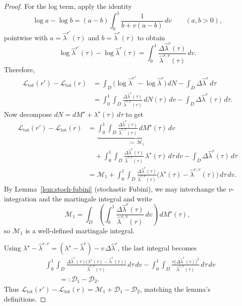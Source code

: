 \documentclass{statsoc}
\newcommand{\1}{\mathbbm{1}}
\begin{document}
\begin{proof}
For the log term, apply the identity
\[
\log a-\log b
=
(a-b)\int_0^1\frac{1}{b+v(a-b)}\,dv
\qquad(a,b>0),
\]
pointwise with $a=\widehat\lambda^{r'}(\tau)$ and $b=\widehat\lambda^{r}(\tau)$ to obtain
\[
\log\widehat\lambda^{r'}(\tau)-\log\widehat\lambda^{r}(\tau)
=
\int_0^1 \frac{\Delta\widehat\lambda^{r}(\tau)}{\widehat\lambda^{r,v}(\tau)}\,dv.
\]
Therefore,
\begin{align*}
\mathcal L_{\mathrm{tot}}(r')-\mathcal L_{\mathrm{tot}}(r)
&=
\int_D\big(\log\widehat\lambda^{r'}-\log\widehat\lambda^{r}\big)\,dN
-
\int_D \Delta\widehat\lambda^{r}\,d\tau\\
&=
\int_0^1\int_D \frac{\Delta\widehat\lambda^{r}(\tau)}{\widehat\lambda^{r,v}(\tau)}\,dN(\tau)\,dv
-
\int_D \Delta\widehat\lambda^{r}(\tau)\,d\tau.
\end{align*}
Now decompose $dN=dM^\star+\lambda^\star(\tau)\,d\tau$ to get
\begin{align*}
\mathcal L_{\mathrm{tot}}(r')-\mathcal L_{\mathrm{tot}}(r)
&=
\underbrace{\int_0^1\int_D \frac{\Delta\widehat\lambda^{r}(\tau)}{\widehat\lambda^{r,v}(\tau)}\,dM^\star(\tau)\,dv}_{:=\,\mathcal M_1}
\\&\quad+
\int_0^1\int_D \frac{\Delta\widehat\lambda^{r}(\tau)}{\widehat\lambda^{r,v}(\tau)}\,\lambda^\star(\tau)\,d\tau\,dv
-
\int_D \Delta\widehat\lambda^{r}(\tau)\,d\tau\\
&=
\mathcal M_1
+
\int_0^1\int_D \frac{\Delta\widehat\lambda^{r}(\tau)}{\widehat\lambda^{r,v}(\tau)}\big(\lambda^\star(\tau)-\widehat\lambda^{r,v}(\tau)\big)\,d\tau\,dv.
\end{align*}
By Lemma~\ref{lem:stoch-fubini} (stochastic Fubini), we may interchange the $v$-integration and the martingale integral and write
\[
\mathcal M_1=\int_D\left(\int_0^1 \frac{\Delta\widehat\lambda^{r}(\tau)}{\widehat\lambda^{r,v}(\tau)}\,dv\right)\,dM^\star(\tau),
\]
so $\mathcal M_1$ is a well-defined martingale integral.


Using $\lambda^\star-\widehat\lambda^{r,v}=(\lambda^\star-\widehat\lambda^{r})-v\,\Delta\widehat\lambda^{r}$, the last integral becomes
\begin{align*}
&\int_0^1\int_D \frac{\Delta\widehat\lambda^{r}(\tau)\big(\lambda^\star(\tau)-\widehat\lambda^{r}(\tau)\big)}{\widehat\lambda^{r,v}(\tau)}\,d\tau\,dv
-
\int_0^1\int_D \frac{v\big(\Delta\widehat\lambda^{r}(\tau)\big)^2}{\widehat\lambda^{r,v}(\tau)}\,d\tau\,dv\\
&\qquad=: \mathcal D_1-\mathcal D_2.
\end{align*}
Thus $\mathcal L_{\mathrm{tot}}(r')-\mathcal L_{\mathrm{tot}}(r)=\mathcal M_1+\mathcal D_1-\mathcal D_2$, matching the lemma's definitions.


\end{proof}
\end{document}
